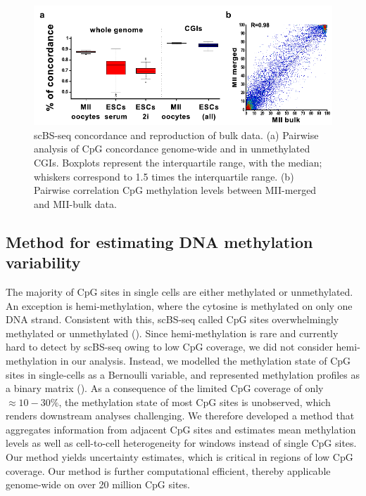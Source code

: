 \begin{figure}[htbp!]
\centering
\includegraphics[width=1.0\textwidth]{concord}
\caption[scBS-seq concordance and reproduction of bulk data.]{scBS-seq concordance and reproduction of bulk data. (a) Pairwise analysis of CpG concordance genome-wide and in unmethylated CGIs. Boxplots represent the interquartile range, with the median; whiskers correspond to 1.5 times the interquartile range. (b) Pairwise correlation CpG methylation levels between MII-merged and MII-bulk data.}
\label{fig:bs_concord}
\end{figure}


\subsection{Method for estimating DNA methylation variability} \label{sec:bs_method}

The majority of CpG sites in single cells are either methylated or unmethylated. An exception is hemi-methylation, where the cytosine is methylated on only one DNA strand. Consistent with this, scBS-seq called CpG sites overwhelmingly methylated or unmethylated (). Since hemi-methylation is rare and currently hard to detect by scBS-seq owing to low CpG coverage, we did not consider hemi-methylation in our analysis. Instead, we modelled the methylation state of CpG sites in single-cells as a Bernoulli variable, and represented methylation profiles as a binary matrix (). As a consequence of the limited CpG coverage of only ${\approx}10-30\%$, the methylation state of most CpG sites is unobserved, which renders downstream analyses challenging. We therefore developed a method that aggregates information from adjacent CpG sites and estimates mean methylation levels as well as cell-to-cell heterogeneity for windows instead of single CpG sites. Our method yields uncertainty estimates, which is critical in regions of low CpG coverage. Our method is further computational efficient, thereby applicable genome-wide on over 20 million CpG sites.


